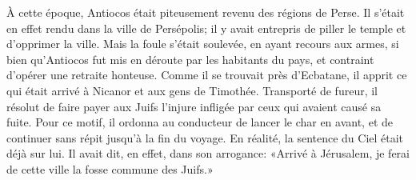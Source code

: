 À cette époque, Antiocos était piteusement revenu des régions de Perse.
Il s’était en effet rendu dans la ville de Persépolis;
	il y avait entrepris de piller le temple et d’opprimer la ville.
Mais la foule s’était soulevée, en ayant recours aux armes,
	si bien qu’Antiocos fut mis en déroute par les habitants du pays,
	et contraint d’opérer une retraite honteuse.
Comme il se trouvait près d’Ecbatane,
	il apprit ce qui était arrivé à Nicanor et aux gens de Timothée.
Transporté de fureur, il résolut de faire payer aux Juifs 
		l’injure infligée par ceux qui avaient causé sa fuite.
Pour ce motif, il ordonna au conducteur de lancer le char en avant,
	et de continuer sans répit jusqu’à la fin du voyage.
En réalité, la sentence du Ciel était déjà sur lui.
Il avait dit, en effet, dans son arrogance:
	«Arrivé à Jérusalem, je ferai de cette ville la fosse commune des Juifs.»
